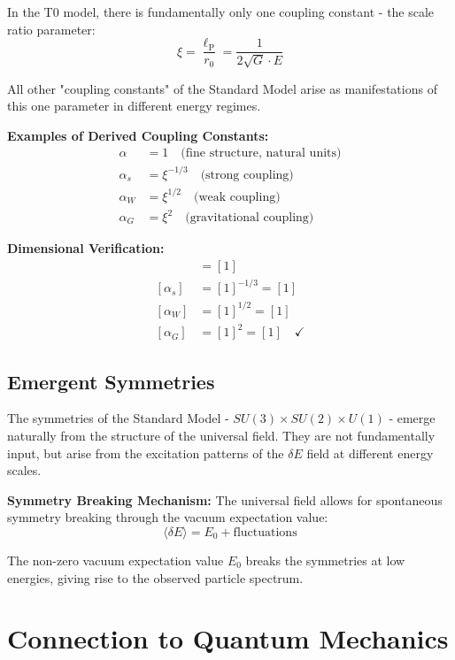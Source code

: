 \documentclass[12pt,a4paper]{report}
\newcommand{\lP}{\ell_{\text{P}}}         %
\newcommand{\rzero}{r_0}                  %
\newcommand{\alphafine}{\alpha}          %
\begin{document}
	In the T0 model, there is fundamentally only one coupling constant - the scale ratio parameter:
	\begin{equation}
		\xi = \frac{\lP}{\rzero} = \frac{1}{2\sqrt{G} \cdot E}
	\end{equation}
	
	All other "coupling constants" of the Standard Model arise as manifestations of this one parameter in different energy regimes.
	
	\textbf{Examples of Derived Coupling Constants:}
	\begin{align}
		\alphafine &= 1 \quad \text{(fine structure, natural units)} \\
		\alpha_s &= \xi^{-1/3} \quad \text{(strong coupling)} \\
		\alpha_W &= \xi^{1/2} \quad \text{(weak coupling)} \\
		\alpha_G &= \xi^2 \quad \text{(gravitational coupling)}
	\end{align}
	
	\textbf{Dimensional Verification:}
	\begin{align}
		[\alphafine] &= [1] \\
		[\alpha_s] &= [1]^{-1/3} = [1] \\
		[\alpha_W] &= [1]^{1/2} = [1] \\
		[\alpha_G] &= [1]^2 = [1] \quad \checkmark
	\end{align}
	
	\subsection{Emergent Symmetries}
	
	The symmetries of the Standard Model - $SU(3) \times SU(2) \times U(1)$ - emerge naturally from the structure of the universal field. They are not fundamentally input, but arise from the excitation patterns of the $\delta E$ field at different energy scales.
	
	\textbf{Symmetry Breaking Mechanism:}
	The universal field allows for spontaneous symmetry breaking through the vacuum expectation value:
	\begin{equation}
		\langle \delta E \rangle = E_0 + \text{fluctuations}
	\end{equation}
	
	The non-zero vacuum expectation value $E_0$ breaks the symmetries at low energies, giving rise to the observed particle spectrum.
	
	\section{Connection to Quantum Mechanics}
	
\end{document}

